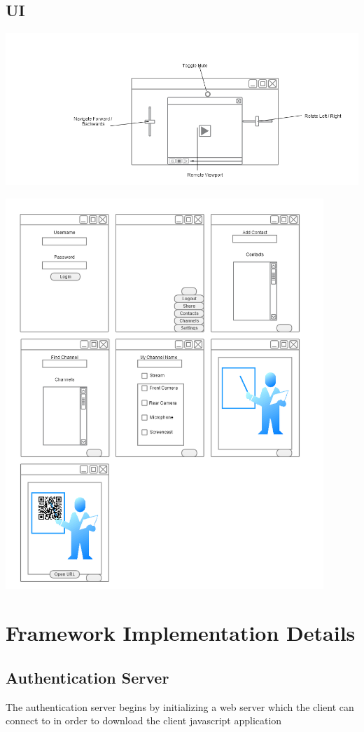 \documentclass[a4paper,12pt]{report}
\begin{document}
\fi
\section{UI}

\includegraphics[width=16cm]{MobileGUI_Labeled}

\includegraphics[width=12cm]{MobileUI}

\chapter{Framework Implementation Details}
\section{Authentication Server}
The authentication server begins by initializing a web server which the client can connect to in order to download the client javascript application
\end{document}
